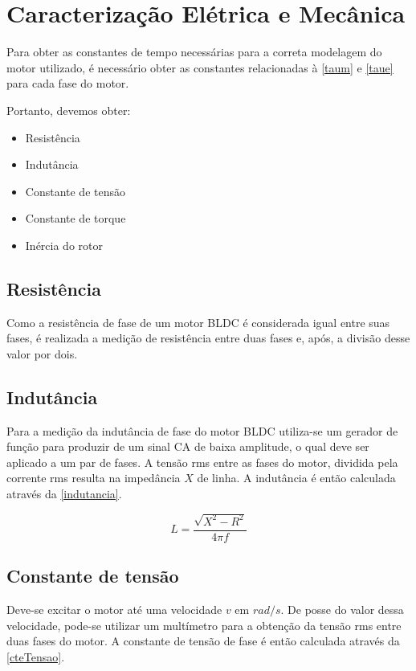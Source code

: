 \documentclass[
	12pt,				%
	openright,			%
	oneside,			%
	a4paper,			%
	english,			%
	french,				%
	spanish,			%
	brazil,				%
	]{abntex2}
\begin{document}
\section{Caracterização Elétrica e Mecânica}

Para obter as constantes de tempo necessárias para a correta modelagem do motor utilizado, é necessário obter as constantes relacionadas à \autoref{taum} e \autoref{taue} para cada fase do motor.

Portanto, devemos obter:

\begin{itemize}
	\item Resistência
	\item Indutância
	\item Constante de tensão
	\item Constante de torque
	\item Inércia do rotor
\end{itemize}

\subsection{Resistência}

Como a resistência de fase de um motor BLDC é considerada igual entre suas fases, é realizada a medição de resistência entre duas fases e, após, a divisão desse valor por dois.

\subsection{Indutância}

Para a medição da indutância de fase do motor BLDC utiliza-se um gerador de função para produzir de um sinal CA de baixa amplitude, o qual deve ser aplicado a um par de fases. A tensão rms entre as fases do motor, dividida  pela corrente rms resulta na impedância $X$ de linha. A indutância é então calculada através da \autoref{indutancia}.

\begin{equation}
\label{indutancia}
  L = \frac{\sqrt{X^2 - R^2}}{4\pi f}
\end{equation}

\subsection{Constante de tensão}

Deve-se excitar o motor até uma velocidade $v$ em $rad/s$. De posse do valor dessa velocidade,  pode-se utilizar um multímetro para a obtenção da tensão rms entre duas fases do motor. A constante de tensão de fase é então calculada através da \autoref{cteTensao}.
\end{document}
